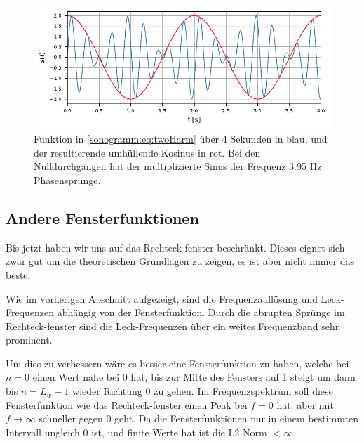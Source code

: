 \begin{figure}
    \centering
    \includegraphics{papers/sonogramm/images/twoharmTime.pdf}
    \caption{Funktion in \eqref{sonogramm:eq:twoHarm} über 4 Sekunden in blau, und der resultierende
    umhüllende Kosinus in rot.
    Bei den Nulldurchgängen hat der multiplizierte Sinus der Frequenz 3.95 Hz Phasensprünge.
    \label{sonogramm:twoHarmTime}
    }
\end{figure}

\subsection{Andere Fensterfunktionen}
Bis jetzt haben wir uns auf das Rechteck-fenster beschränkt.
Dieses eignet sich zwar gut um die theoretischen Grundlagen zu zeigen,
es ist aber nicht immer das beste.

Wie im vorherigen Abschnitt aufgezeigt, sind die Frequenzauflösung und 
Leck-Frequenzen abhängig von der Fensterfunktion.
Durch die abrupten Sprünge im Rechteck-fenster sind die Leck-Frequenzen 
über ein weites Frequenzband sehr prominent.

Um dies zu verbessern wäre es besser eine Fensterfunktion zu haben,
welche bei $n = 0$ einen Wert nahe bei 0 hat,
bis zur Mitte des Fensters auf 1 steigt um dann bis $n = L_w -1$ wieder Richtung 0 zu gehen. 
Im Frequenzspektrum soll diese Fensterfunktion wie das Rechteck-fenster einen 
Peak bei $f = 0$ hat. aber mit $f \rightarrow \infty$ schneller
gegen 0 geht.
Da die Fensterfunktionen nur in einem bestimmten Intervall ungleich 0 ist, und finite Werte
hat ist die L2 Norm $< \infty$.


